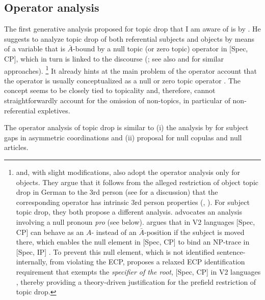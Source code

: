 \subsection{Operator analysis}\label{sec:syntax.operator} 
The first generative analysis proposed for topic drop that I am aware of is by \citet{huang1984}.
He suggests to analyze topic drop of both referential subjects and objects by means of a variable that is $\bar{A}$-bound by a null topic (or zero topic) operator in [Spec, CP], which in turn is linked to the discourse (\cite[543; 548]{huang1984}; see also \cite{sigurdsson1989} and \cite{haegeman1990} for similar approaches).%
\footnote{\citet{cardinaletti1990} and, with slight modifications, also \citet{rizzi1994} adopt the operator analysis only for objects.
They argue that it follows from the alleged restriction of object topic drop in German to the 3rd person (see  for a discussion) that the corresponding operator has intrinsic 3rd person properties (\cite[79]{cardinaletti1990}, \cite[161]{rizzi1994}).
For subject topic drop, they both propose a different analysis.
\citet{cardinaletti1990} advocates an analysis involving a null pronoun \textit{pro} (see below). 
\citet{rizzi1994} argues that in V2 languages  [Spec, CP] can behave as an ${A}$- instead of an $\bar{A}$-position if the subject is moved there, which enables the null element in [Spec, CP] to bind an NP-trace in [Spec, IP] \citep[161]{rizzi1994}.
To prevent this null element, which is not identified sentence-internally, from violating the ECP, \citet{rizzi1994} proposes a relaxed ECP identification requirement that exempts the \textit{specifier of the root}, [Spec, CP] in V2 languages  \citep[162]{rizzi1994}, thereby providing a theory-driven justification for the prefield restriction of topic drop.}
%
It already hints at the main problem of the operator account that the operator is usually conceptualized as a null or zero topic operator \citep{huang1984, sigurdsson1989, cardinaletti1990, haegeman1990}.
The concept seems to be closely tied to topicality and, therefore, cannot straightforwardly account for the omission of non-topics, in particular of non-referential expletives. 

The operator analysis of topic drop is similar to (i) the analysis by \citet{buering.hartmann1998} for subject gaps  in asymmetric coordinations and (ii)  proposal for null copulas and null articles. 

